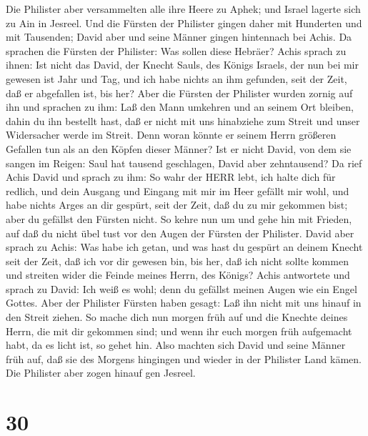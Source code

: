  Die Philister aber versammelten alle ihre Heere zu Aphek;
und Israel lagerte sich zu Ain in Jesreel.  Und die Fürsten
der Philister gingen daher mit Hunderten und mit Tausenden; David aber
und seine Männer gingen hintennach bei Achis.  Da sprachen
die Fürsten der Philister: Was sollen diese Hebräer? Achis sprach zu
ihnen: Ist nicht das David, der Knecht Sauls, des Königs Israels, der
nun bei mir gewesen ist Jahr und Tag, und ich habe nichts an ihm
gefunden, seit der Zeit, daß er abgefallen ist, bis her? 
Aber die Fürsten der Philister wurden zornig auf ihn und sprachen zu
ihm: Laß den Mann umkehren und an seinem Ort bleiben, dahin du ihn
bestellt hast, daß er nicht mit uns hinabziehe zum Streit und unser
Widersacher werde im Streit. Denn woran könnte er seinem Herrn größeren
Gefallen tun als an den Köpfen dieser Männer?  Ist er nicht
David, von dem sie sangen im Reigen: Saul hat tausend geschlagen, David
aber zehntausend?  Da rief Achis David und sprach zu ihm: So
wahr der HERR lebt, ich halte dich für redlich, und dein Ausgang und
Eingang mit mir im Heer gefällt mir wohl, und habe nichts Arges an dir
gespürt, seit der Zeit, daß du zu mir gekommen bist; aber du gefällst
den Fürsten nicht.  So kehre nun um und gehe hin mit
Frieden, auf daß du nicht übel tust vor den Augen der Fürsten der
Philister.  David aber sprach zu Achis: Was habe ich getan,
und was hast du gespürt an deinem Knecht seit der Zeit, daß ich vor dir
gewesen bin, bis her, daß ich nicht sollte kommen und streiten wider die
Feinde meines Herrn, des Königs?  Achis antwortete und
sprach zu David: Ich weiß es wohl; denn du gefällst meinen Augen wie ein
Engel Gottes. Aber der Philister Fürsten haben gesagt: Laß ihn nicht mit
uns hinauf in den Streit ziehen.  So mache dich nun morgen
früh auf und die Knechte deines Herrn, die mit dir gekommen sind; und
wenn ihr euch morgen früh aufgemacht habt, da es licht ist, so gehet
hin.  Also machten sich David und seine Männer früh auf,
daß sie des Morgens hingingen und wieder in der Philister Land kämen.
Die Philister aber zogen hinauf gen Jesreel.

\hypertarget{section-29}{%
\section{30}\label{section-29}}

